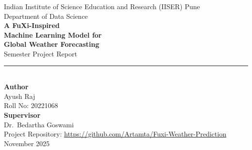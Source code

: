 \documentclass[12pt]{report}
\begin{document}
\begin{titlepage}
\centering

\vspace*{1.2cm}

{\Large Indian Institute of Science Education and Research (IISER) Pune}\\[4pt]
{\large Department of Data Science}\\[1.2cm]

{\Huge\bfseries A FuXi-Inspired\\[4pt]
Machine Learning Model for\\[4pt]
Global Weather Forecasting}\\[1.2cm]

{\Large Semester Project Report}\\[0.3cm]
\rule{0.55\linewidth}{0.7pt}\\[1.0cm]

{\large\textbf{Author}}\\[3pt]
{\Large Ayush Raj}\\
{\large Roll No: 20221068}\\[0.8cm]

{\large\textbf{Supervisor}}\\[3pt]
{\Large Dr.\ Bedartha Goswami}\\[1.3cm]

\vfill
{\footnotesize Project Repository: \url{https://github.com/Artamta/Fuxi-Weather-Prediction}}\\[0.2cm]
{\large November 2025}

\end{titlepage}


\begin{abstract}
We present a FuXi-inspired deep learning pipeline for single-step (6-hour) global weather forecasting on a coarse ($64\times32$) ERA5 grid. The model ingests two consecutive timesteps and predicts the next state for 20 channels (five surface and fifteen upper-air features). The architecture combines a 3D cube embedding, a reduced-depth Swin Transformer V2 encoder for hierarchical global context, and a U-Net-style decoder for spatial reconstruction. A $1\times1$ projection and bilinear interpolation produce the final forecast fields.

Training was stable, but the limited spatial resolution caused oversmoothing and collapse toward climatological means. I present evaluation metrics (RMSE, ACC, latitude-weighted L1), qualitative comparison plots, and per-variable error analyses. Future extensions include higher-resolution experiments, deeper Swin stacks, autoregressive FuXi-style cascades, and ensemble uncertainty estimation.
\end{abstract}
\end{document}
